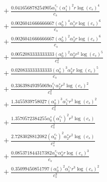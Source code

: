 \documentclass[10pt]{article}
\begin{document}
\begin{align*}
&{}  + \frac{0.041656878254905 \alpha_{1}^{c_s} \left(\alpha_{1}^s\right)^{2} r \log{\left(c_{s} \right)}^{4}}{c_{s}} \\
&{}  + \frac{0.0026041666666667 \left(\alpha_{0}^s\right)^{4} \alpha_{1}^s r \log{\left(c_{s} \right)}^{6}}{c_{s}} \\
&{}  + \frac{0.0026041666666667 \left(\alpha_{0}^s\right)^{2} \alpha_{3}^s r \log{\left(c_{s} \right)}^{6}}{c_{s}} \\
&{}  + \frac{0.0052083333333333 \left(\alpha_{0}^s\right)^{2} \alpha_{2}^s r^{2} \log{\left(c_{s} \right)}^{5}}{c_{s}^{2}} \\
&{}  + \frac{0.020833333333333 \left(\alpha_{0}^s\right)^{3} \alpha_{2}^s r \log{\left(c_{s} \right)}^{5}}{c_{s}} \\
&{}  + \frac{0.33639849395069 \alpha_{1}^{c_s} \alpha_{2}^s r^{2} \log{\left(c_{s} \right)}^{2}}{c_{s}^{2}} \\
&{}  + \frac{1.3455939758027 \left(\alpha_{0}^s\right)^{3} \alpha_{1}^{c_s} r^{2} \log{\left(c_{s} \right)}^{2}}{c_{s}^{2}} \\
&{}  + \frac{1.3570572384255 \alpha_{0}^s \left(\alpha_{1}^{c_s}\right)^{2} r^{2} \log{\left(c_{s} \right)}}{c_{s}^{2}} \\
&{}  + \frac{2.7283028812082 \left(\alpha_{0}^{c_s}\right)^{2} \alpha_{2}^s r^{2} \log{\left(c_{s} \right)}}{c_{s}^{2}} \\
&{}  + \frac{0.085371844317382 \alpha_{0}^{c_s} \alpha_{4}^s r \log{\left(c_{s} \right)}^{3}}{c_{s}} \\
&{}  + \frac{0.35099450851797 \left(\alpha_{0}^s\right)^{2} \alpha_{1}^{c_s} r^{3} \log{\left(c_{s} \right)}^{2}}{c_{s}^{3}}
\end{align*}
\end{document}
